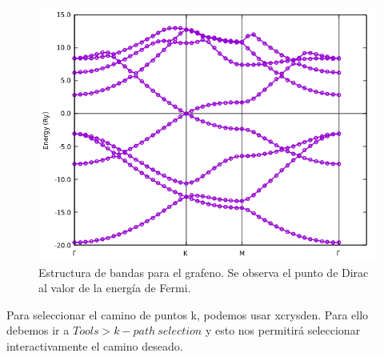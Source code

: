   \begin{figure}[H]
      \centering
      \includegraphics[scale = 0.6]{figs/D1/bandas.png}
      \caption{Estructura de bandas para el grafeno. Se observa el punto de Dirac al valor de la energía de Fermi.}
  \end{figure}

  Para seleccionar el camino de puntos k, podemos usar xcrysden. Para ello debemos ir a $Tools > k-path\ selection$ y esto nos permitirá seleccionar interactivamente el camino deseado.
